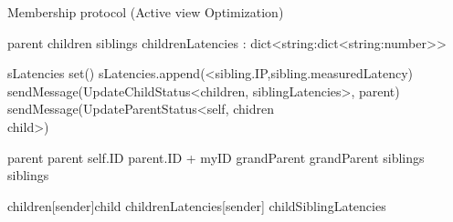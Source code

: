 \begin{algorithm}
    \caption{Membership protocol (Active view Optimization)} \label{alg:memb:active_view_maint}
    \begin{algorithmic}[1]
        \asdstate
            \State parent  \label{alg:memb:active_view_maint:state_start}
            \State children  
            \State siblings  
            \State childrenLatencies : dict<string:dict<string:number>> \label{alg:memb:active_view_maint:state_end} 
        \asdend

         \label{alg:memb:active_view_maint:update}
                \State sLatencies \asdassign set()
                    \State sLatencies.append(<sibling.IP,sibling.measuredLatency)
                \EndFor
                \State sendMessage(UpdateChildStatus<children, siblingLatencies>, parent)
            \EndIf
                \State sendMessage(UpdateParentStatus<self, chidren \\ child>)
            \EndFor
        \asdend \label{alg:memb:active_view_maint:update_end}

        \label{alg:memb:active_view_maint:update_recv_par}
                \State parent \asdassign parent
                \State self.ID \asdassign parent.ID + myID
                \State grandParent \asdassign grandParent
                \State siblings \asdassign siblings
            \EndIf
        \asdend

        \label{alg:memb:active_view_maint:update_recv_chi}
                \State children[sender]\asdassign child
                \State childrenLatencies[sender] \asdassign childSiblingLatencies
            \EndIf
        \asdend


\end{algorithmic}
\end{algorithm}

